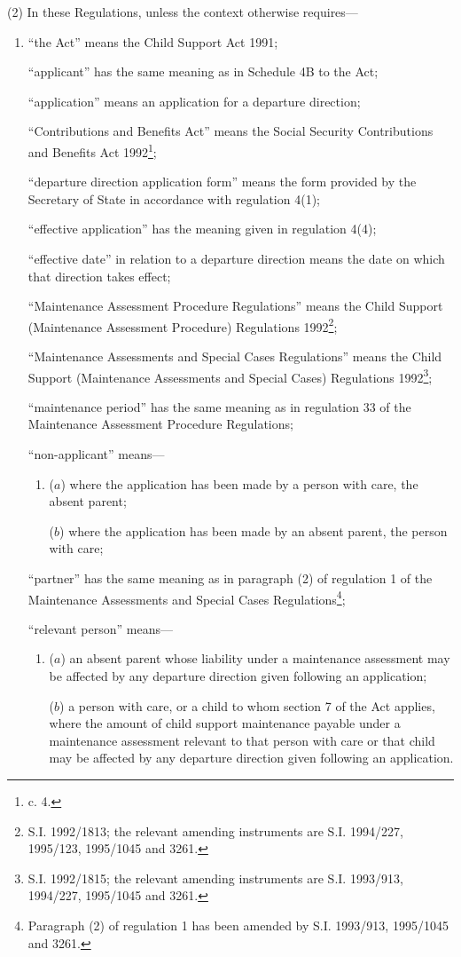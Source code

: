 \documentclass[a4paper]{article}
\begin{document}
(2) In these Regulations, unless the context otherwise requires—
\begin{enumerate}\item[]
“the Act” means the Child Support Act 1991;

“applicant” has the same meaning as in Schedule 4B to the Act;

“application” means an application for a departure direction;

“Contributions and Benefits Act” means the Social Security Contributions and Benefits Act 1992\footnote{ c. 4.};

“departure direction application form” means the form provided by the Secretary of State in accordance with regulation 4(1);

“effective application” has the meaning given in regulation 4(4);

“effective date” in relation to a departure direction means the date on which that direction takes effect;

“Maintenance Assessment Procedure Regulations” means the Child Support (Maintenance Assessment Procedure) Regulations 1992\footnote{\frenchspacing S.I. 1992/1813; the relevant amending instruments are S.I. 1994/227, 1995/123, 1995/1045 and 3261.};

“Maintenance Assessments and Special Cases Regulations” means the Child Support (Maintenance Assessments and Special Cases) Regulations 1992\footnote{\frenchspacing S.I. 1992/1815; the relevant amending instruments are S.I. 1993/913, 1994/227, 1995/1045 and 3261.};

“maintenance period” has the same meaning as in regulation 33 of the Maintenance Assessment Procedure Regulations;

“non-applicant” means—
\begin{enumerate}\item[]
($a$) where the application has been made by a person with care, the absent parent;

($b$) where the application has been made by an absent parent, the person with care;
\end{enumerate}

“partner” has the same meaning as in paragraph (2) of regulation 1 of the Maintenance Assessments and Special Cases Regulations\footnote{\frenchspacing Paragraph (2) of regulation 1 has been amended by S.I. 1993/913, 1995/1045 and 3261.};

“relevant person” means—
\begin{enumerate}\item[]
($a$) an absent parent whose liability under a maintenance assessment may be affected by any departure direction given following an application;

($b$) a person with care, or a child to whom section 7 of the Act applies, where the amount of child support maintenance payable under a maintenance assessment relevant to that person with care or that child may be affected by any departure direction given following an application.
\end{enumerate}
\end{enumerate}
\end{document}
